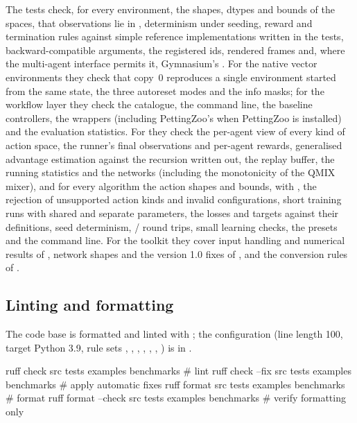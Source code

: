 The tests check, for every environment, the shapes, dtypes and bounds of the
spaces, that observations lie in , determinism under
seeding, reward and termination rules against simple reference
implementations written in the tests, backward-compatible arguments, the
registered ids, rendered frames and, where the multi-agent interface permits
it, Gymnasium's . For the native vector environments they
check that copy~0 reproduces a single environment started from the same state,
the three autoreset modes and the info masks; for the workflow layer they
check the catalogue, the command line, the baseline controllers, the wrappers
(including PettingZoo's  when PettingZoo is
installed) and the evaluation statistics. For  they check the per-agent
view of every kind of action space, the runner's final observations and
per-agent rewards, generalised advantage estimation against the recursion
written out, the replay buffer, the running statistics and the networks
(including the monotonicity of the QMIX mixer), and for every algorithm the
action shapes and bounds,  with ,
the rejection of unsupported action kinds and invalid configurations, short
training runs with shared and separate parameters, the losses and targets
against their definitions, seed determinism, / round
trips, small learning checks, the presets and the  command
line. For the toolkit they cover input handling and numerical
results of , network shapes and the version 1.0 fixes of
, and the conversion rules of .

\subsection{Linting and formatting}

The code base is formatted and linted with ; the configuration
(line length 100, target Python 3.9, rule sets , , ,
, , , ) is in .

\begin{shellcode}
ruff check src tests examples benchmarks          # lint
ruff check --fix src tests examples benchmarks    # apply automatic fixes
ruff format src tests examples benchmarks         # format
ruff format --check src tests examples benchmarks # verify formatting only
\end{shellcode}

